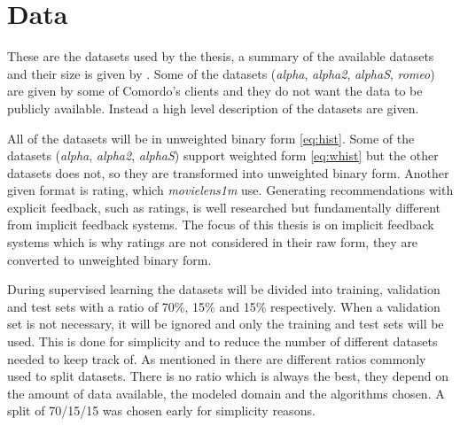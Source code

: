 
\section{Data}\label{sec:datasets}

These are the datasets used by the thesis, a summary of the available datasets and their size is given by . Some of the datasets (\textit{alpha}, \textit{alpha2}, \textit{alphaS}, \textit{romeo}) are given by some of Comordo's clients and they do not want the data to be publicly available. Instead a high level description of the datasets are given.

All of the datasets will be in unweighted binary form \eqref{eq:hist}. Some of the datasets (\textit{alpha}, \textit{alpha2}, \textit{alphaS}) support weighted form \eqref{eq:whist} but the other datasets does not, so they are transformed into unweighted binary form. Another given format is rating, which \textit{movielens1m} use. Generating recommendations with explicit feedback, such as ratings, is well researched but fundamentally different from implicit feedback systems. The focus of this thesis is on implicit feedback systems which is why ratings are not considered in their raw form, they are converted to unweighted binary form.

During supervised learning the datasets will be divided into training, validation and test sets with a ratio of 70\%, 15\% and 15\% respectively. When a validation set is not necessary, it will be ignored and only the training and test sets will be used. This is done for simplicity and to reduce the number of different datasets needed to keep track of.  As mentioned in  there are different ratios commonly used to split datasets. There is no ratio which is always the best, they depend on the amount of data available, the modeled domain and the algorithms chosen. A split of 70/15/15 was chosen early for simplicity reasons.

